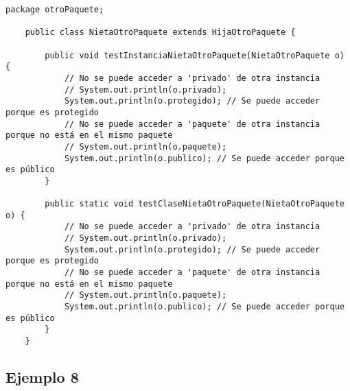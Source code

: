 \documentclass[a4paper,12pt]{article}
\begin{document}
\begin{lstlisting}[style=customjava]
    package otroPaquete;
    
    public class NietaOtroPaquete extends HijaOtroPaquete {
    
        public void testInstanciaNietaOtroPaquete(NietaOtroPaquete o) {
            // No se puede acceder a 'privado' de otra instancia
            // System.out.println(o.privado);
            System.out.println(o.protegido); // Se puede acceder porque es protegido
            // No se puede acceder a 'paquete' de otra instancia porque no está en el mismo paquete
            // System.out.println(o.paquete);
            System.out.println(o.publico); // Se puede acceder porque es público
        }
    
        public static void testClaseNietaOtroPaquete(NietaOtroPaquete o) {
            // No se puede acceder a 'privado' de otra instancia
            // System.out.println(o.privado);
            System.out.println(o.protegido); // Se puede acceder porque es protegido
            // No se puede acceder a 'paquete' de otra instancia porque no está en el mismo paquete
            // System.out.println(o.paquete);
            System.out.println(o.publico); // Se puede acceder porque es público
        }
    }
    \end{lstlisting}

\subsection{Ejemplo 8}
\end{document}
